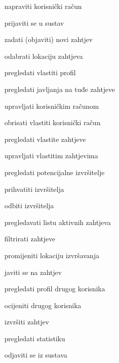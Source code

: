 			
			\begin{packed_enum}
				\item  {}
				
				\begin{packed_enum}
					
					\item napraviti korisnički račun
					\item prijaviti se u sustav
					
					
				\end{packed_enum}
				
				\item  {}
				
				\begin{packed_enum}
					
					\item zadati (objaviti) novi zahtjev
					\begin{packed_enum}
						\item odabrati lokaciju zahtjeva
						
					\end{packed_enum}
					\item pregledati vlastiti profil
					\begin{packed_enum}
						\item pregledati javljanja na tuđe zahtjeve
						\item upravljati korisničkim računom
						\item obrisati vlastiti korisnički račun
					\end{packed_enum}
					\item pregledati vlastite zahtjeve
					\begin{packed_enum}
						\item upravljati vlastitim zahtjevima
						\item pregledati potencijalne izvršitelje
						\begin{packed_enum}
							\item prihvatiti izvršitelja
							\item odbiti izvršitelja	
						\end{packed_enum}
					\end{packed_enum}
					\item pregledavati listu aktivnih zahtjeva
					\begin{packed_enum}
						\item filtrirati zahtjeve
						\item promijeniti lokaciju izvršavanja
						\item javiti se na zahtjev	
					\end{packed_enum}
					\item pregledati profil drugog korisnika
					\item  ocijeniti drugog korisnika
					\item izvršiti zahtjev
					\item pregledati statistiku
					\item odjaviti se iz sustava
					

\end{packed_enum}
\end{packed_enum}
